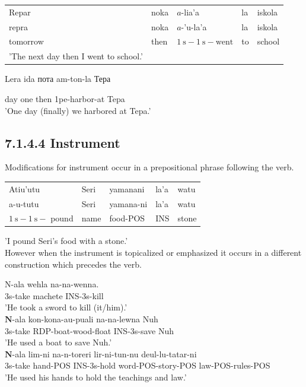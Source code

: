 \documentclass[10pt]{article}
\begin{document}
\begin{center}
\begin{tabular}{lllll}
Repar & noka & \(a\)-lia'a & la & iskola \\
repra & noka & \(a\)-'u-la'a & la & iskola \\
tomorrow & then & \(1 \mathrm{~s}-1 \mathrm{~s}-\mathrm{went}\) & to & school \\
'The next day then I went to school.' &  &  &  &  \\
\end{tabular}
\end{center}

Lera ida пота am-ton-la Тера

day one then 1pe-harbor-at Tepa\\
'One day (finally) we harbored at Tepa.'

\subsection*{7.1.4.4 Instrument}
Modifications for instrument occur in a prepositional phrase following the verb.

\begin{center}
\begin{tabular}{lllll}
Atiu'utu & Seri & yamanani & la'a & watu \\
a-u-tutu & Seri & yamana-ni & la'a & watu \\
\(1 \mathrm{~s}-1 \mathrm{~s}-\) pound & name & food-POS & INS & stone \\
\end{tabular}
\end{center}

'I pound Seri's food with a stone.'\\
However when the instrument is topicalized or emphasized it occurs in a different construction which precedes the verb.

N-ala wehla na-na-wenna.\\
3s-take machete INS-3s-kill\\
'He took a sword to kill (it/him).'\\
\(\boldsymbol{N}\)-ala kon-kona-au-puali na-na-lewna Nuh\\
3s-take RDP-boat-wood-float INS-3s-save Nuh\\
'He used a boat to save Nuh.'\\
\(\boldsymbol{N}\)-ala lim-ni na-n-toreri lir-ni-tun-nu deul-lu-tatar-ni\\
3s-take hand-POS INS-3s-hold word-POS-story-POS law-POS-rules-POS\\
'He used his hands to hold the teachings and law.'
\end{document}
